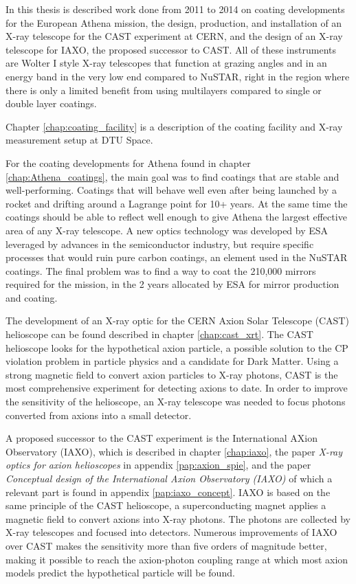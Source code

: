 In this thesis is described work done from 2011 to 2014 on coating developments for the European Athena mission, the design, production, and installation of an X-ray telescope for the CAST experiment at CERN, and the design of an X-ray telescope for IAXO, the proposed successor to CAST. All of these instruments are Wolter I style X-ray telescopes that function at grazing angles and in an energy band in the very low end compared to NuSTAR, right in the region where there is only a limited benefit from using multilayers compared to single or double layer coatings.

Chapter \ref{chap:coating_facility} is a description of the coating facility and X-ray measurement setup at DTU Space. %

For the coating developments for Athena found in chapter \ref{chap:Athena_coatings}, the main goal was to find coatings that are stable and well-performing. Coatings that will behave well even after being launched by a rocket and drifting around a Lagrange point for 10+ years. At the same time the coatings should be able to reflect well enough to give Athena the largest effective area of any X-ray telescope. A new optics technology was developed by ESA leveraged by advances in the semiconductor industry, but require specific processes that would ruin pure carbon coatings, an element used in the NuSTAR coatings. The final problem was to find a way to coat the 210,000 mirrors required for the mission, in the 2 years allocated by ESA for mirror production and coating.

The development of an X-ray optic for the CERN Axion Solar Telescope (CAST) helioscope can be found described in chapter \ref{chap:cast_xrt}. The CAST helioscope looks for the hypothetical axion particle, a possible solution to the CP violation problem in particle physics and a candidate for Dark Matter. Using a strong magnetic field to convert axion particles to X-ray photons, CAST is the most comprehensive experiment for detecting axions to date. In order to improve the sensitivity of the helioscope, an X-ray telescope was needed to focus photons converted from axions into a small detector.

A proposed successor to the CAST experiment is the International AXion Observatory (IAXO), which is described in chapter \ref{chap:iaxo}, the paper \emph{X-ray optics for axion helioscopes} in appendix \ref{pap:axion_spie}, and the paper \emph{Conceptual design of the International Axion Observatory (IAXO)} of which a relevant part is found in appendix \ref{pap:iaxo_concept}. IAXO is based on the same principle of the CAST helioscope, a superconducting magnet applies a magnetic field to convert axions into X-ray photons. The photons are collected by X-ray telescopes and focused into detectors. Numerous improvements of IAXO over CAST makes the sensitivity more than five orders of magnitude better, making it possible to reach the axion-photon coupling range at which most axion models predict the hypothetical particle will be found.

